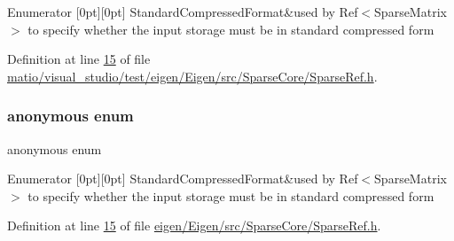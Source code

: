 \begin{DoxyEnumFields}{Enumerator}
[0pt][0pt]{}\mbox{\label{namespace_eigen_a668ffb0fb66c55c1c98bd35c52df648eaf81fc519ed9cc0ebc6aac69a366086a5}} 
Standard\+Compressed\+Format&used by Ref$<$\+Sparse\+Matrix$>$ to specify whether the input storage must be in standard compressed form \\
\hline

\end{DoxyEnumFields}


Definition at line \hyperlink{matio_2visual__studio_2test_2eigen_2_eigen_2src_2_sparse_core_2_sparse_ref_8h_source_l00015}{15} of file \hyperlink{matio_2visual__studio_2test_2eigen_2_eigen_2src_2_sparse_core_2_sparse_ref_8h_source}{matio/visual\+\_\+studio/test/eigen/\+Eigen/src/\+Sparse\+Core/\+Sparse\+Ref.\+h}.

\mbox{\label{namespace_eigen_a1f69f2fe43c9ea993c28e025f0dc4db1}} 
\subsubsection{\texorpdfstring{anonymous enum}{anonymous enum}}
{\footnotesize\ttfamily anonymous enum}

\begin{DoxyEnumFields}{Enumerator}
[0pt][0pt]{}\mbox{\label{namespace_eigen_a668ffb0fb66c55c1c98bd35c52df648eaf81fc519ed9cc0ebc6aac69a366086a5}} 
Standard\+Compressed\+Format&used by Ref$<$\+Sparse\+Matrix$>$ to specify whether the input storage must be in standard compressed form \\
\hline

\end{DoxyEnumFields}


Definition at line \hyperlink{eigen_2_eigen_2src_2_sparse_core_2_sparse_ref_8h_source_l00015}{15} of file \hyperlink{eigen_2_eigen_2src_2_sparse_core_2_sparse_ref_8h_source}{eigen/\+Eigen/src/\+Sparse\+Core/\+Sparse\+Ref.\+h}.

